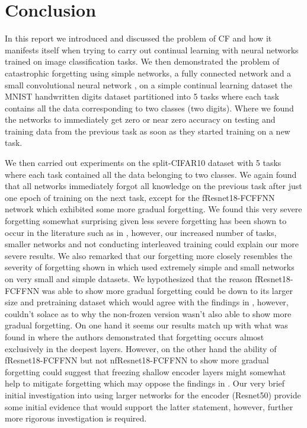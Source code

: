 \section{Conclusion}
In this report we introduced and discussed the problem of CF and how it manifests itself when trying to carry out continual learning with neural networks trained on image classification tasks. We then demonstrated the problem of catastrophic forgetting using simple networks, a fully connected network and a small convolutional neural network \cite{lecun1995convolutional}, on a simple continual learning dataset the MNIST handwritten digits dataset \cite{deng2012mnist} partitioned into 5 tasks where each task contains all the data corresponding to two classes (two digits). Where we found the networks to immediately get zero or near zero accuracy on testing and training data from the previous task as soon as they started training on a new task. 

We then carried out experiments on the split-CIFAR10 dataset with 5 tasks where each task contained all the data belonging to two classes. We again found that all networks immediately forgot all knowledge on the previous task after just one epoch of training on the next task, except for the fResnet18-FCFFNN network which exhibited some more gradual forgetting. We found this very severe forgetting somewhat surprising given less severe forgetting has been shown to occur in the literature such as in \cite{ramasesh2022effect,toneva2018empirical}, however, our increased number of tasks, smaller networks and not conducting interleaved training could explain our more severe results. We also remarked that our forgetting more closely resembles the severity of forgetting shown in \cite{mccloskey1989catastrophic} which used extremely simple and small networks on very small and simple datasets. We hypothesized that the reason fResnet18-FCFFNN was able to show more gradual forgetting could be down to its larger size and pretraining dataset which would agree with the findings in \cite{ramasesh2022effect}, however, couldn't solace as to why the non-frozen version wasn't also able to show more gradual forgetting. On one hand it seems our results match up with what was found in \cite{ramasesh2020anatomy} where the authors demonstrated that forgetting occurs almost exclusively in the deepest layers. However, on the other hand the ability of fResnet18-FCFFNN but not nfResnet18-FCFFNN to show more gradual forgetting could suggest that freezing shallow encoder layers might somewhat help to mitigate forgetting which may oppose the findings in \cite{ramasesh2020anatomy}. Our very brief initial investigation into using larger networks for the encoder (Resnet50) provide some initial evidence that would support the latter statement, however, further more rigorous investigation is required.

